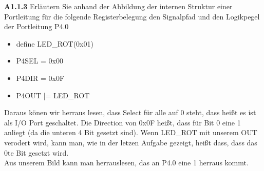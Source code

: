 \documentclass[a4paper,ngerman]{article}
\begin{document}
\begin{description}
\begin{description}
\end{description}

\item{\bfseries A1.1.3} Erläutern Sie anhand der Abbildung der internen Struktur einer Portleitung für die folgende Registerbelegung den Signalpfad und den Logikpegel der Portleitung P4.0

\begin{itemize}
\item define LED\_ROT(0x01)
\item P4SEL = 0x00
\item P4DIR = 0x0F
\item P4OUT |= LED\_ROT

\end{itemize}

Daraus könen wir herraus lesen, dass Select für alle auf 0 steht, dass heißt es ist als I/O Port geschaltet. Die Direction von 0x0F heißt, dass für Bit 0 eine 1 anliegt (da die unteren 4 Bit gesetzt sind). Wenn LED\_ROT mit unserem OUT verodert wird, kann man, wie in der letzen Aufgabe gezeigt, heißt dass, dass das 0te Bit gesetzt wird.\\
Aus unserem Bild kann man herrauslesen, das an P4.0 eine 1 herraus kommt.

\end{description}
\end{document}
